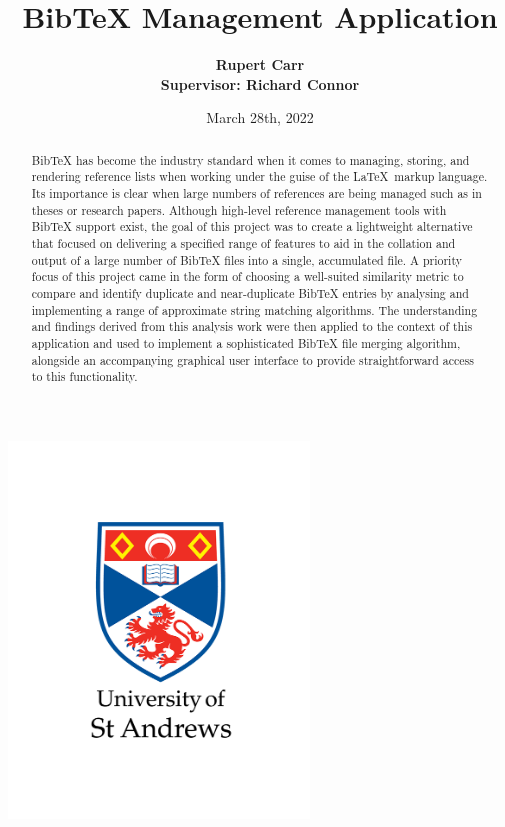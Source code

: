 \documentclass[a4paper,11pt]{article}
\title{BibTeX Management Application}
\author{\bf{Rupert Carr} \\[0.5cm]{\small \textbf{Supervisor}: Richard Connor}}
\date{March 28th, 2022}
\begin{document}
\maketitle\thispagestyle{empty}

\begin{center}
\includegraphics[width=8cm]{images/01-standard-vertical-black-text.png}
\end{center}

\hrulefill

\begin{abstract}
    BibTeX has become the industry standard when it comes to managing, storing, and rendering reference lists when working under the guise of the \LaTeX\ markup language. Its importance is clear when large numbers of references are being managed such as in theses or research papers. Although high-level reference management tools with BibTeX support exist, the goal of this project was to create a lightweight alternative that focused on delivering a specified range of features to aid in the collation and output of a large number of BibTeX files into a single, accumulated file. A priority focus of this project came in the form of choosing a well-suited similarity metric to compare and identify duplicate and near-duplicate BibTeX entries by analysing and implementing a range of approximate string matching algorithms. The understanding and findings derived from this analysis work were then applied to the context of this application and used to implement a sophisticated BibTeX file merging algorithm, alongside an accompanying graphical user interface to provide straightforward access to this functionality.
\end{abstract}
\end{document}
